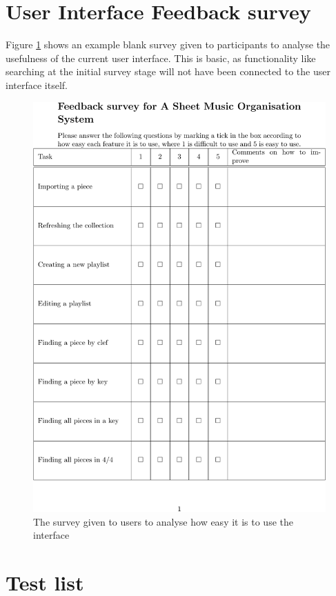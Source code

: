 \begin{appendices}
\section{User Interface Feedback survey}
Figure \ref{fig:survey} shows an example blank survey given to participants to analyse the usefulness of the current user interface. This is basic, as functionality like searching at the initial survey stage will not have been connected to the user interface itself.
\begin{figure}[H]
\centering
\includegraphics{survey-crop.pdf}	
\caption{The survey given to users to analyse how easy it is to use the interface}
\label{fig:survey}
\end{figure}

\section{Test list}

\end{appendices}
